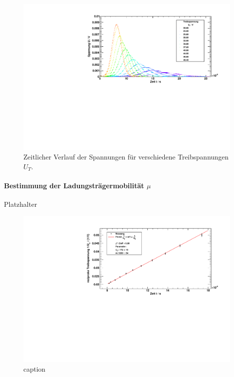 \begin{figure}[H]
\begin{center}
  \includegraphics[width=\textwidth]{../img/part2/voltages.pdf}
  \caption{Zeitlicher Verlauf der Spannungen für verschiedene Treibspannungen $U_T$.}
  \label{img:volts}
\end{center}
\end{figure}

\paragraph{Bestimmung der Ladungsträgermobilität $\mu$} 
Platzhalter

\begin{figure}[H]
\begin{center}
  \includegraphics[width=\textwidth]{../img/part2/volt_fitXc.pdf}
  \caption{caption}
  \label{img:volt:fitxc}
\end{center}
\end{figure}

